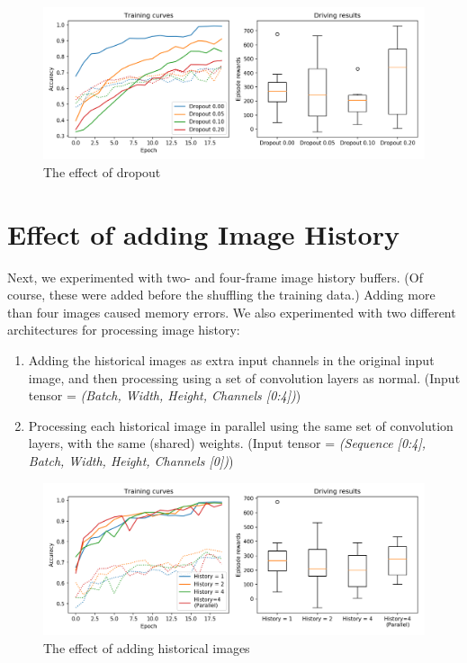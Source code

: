 \documentclass[11pt]{article} %
\begin{document}
\begin{figure}
	\includegraphics[width=\linewidth]{figs/dropout.png}
	\caption{The effect of dropout}
	\label{fig:dropout}
\end{figure}

\section{Effect of adding Image History}

Next, we experimented with two- and four-frame image history buffers. (Of course, these were added before the shuffling the training data.) Adding more than four images caused memory errors. We also experimented with two different architectures for processing image history:

\begin{enumerate}
	\item Adding the historical images as extra input channels in the original input image, and then processing using a set of convolution layers as normal. (Input tensor = \textit{(Batch, Width, Height, Channels [0:4])})
	\item Processing each historical image in parallel using the same set of convolution layers, with the same (shared) weights. (Input tensor = \textit{(Sequence [0:4], Batch, Width, Height, Channels [0])})
\end{enumerate}

\begin{figure}
	\includegraphics[width=\linewidth]{figs/history.png}
	\caption{The effect of adding historical images}
	\label{fig:history}
\end{figure}
\end{document}
